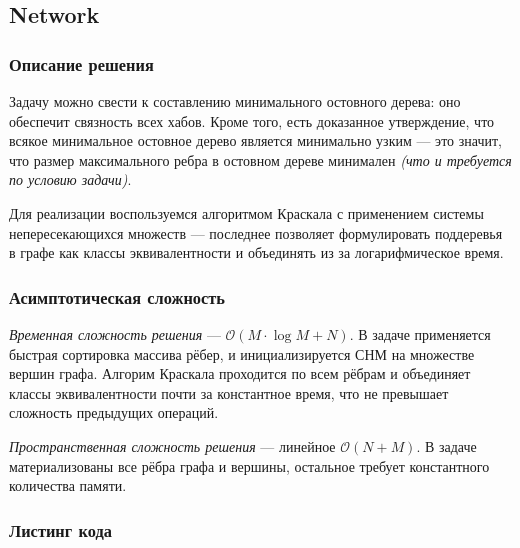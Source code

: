 \subsection{Network}

\subsubsection{Описание решения}

Задачу можно свести к составлению минимального остовного дерева: оно обеспечит связность всех хабов. Кроме того, есть доказанное утверждение, что всякое минимальное остовное дерево является минимально узким --- это значит, что размер максимального ребра в остовном дереве минимален \textit{(что и требуется по условию задачи)}.

Для реализации воспользуемся алгоритмом Краскала с применением системы непересекающихся множеств --- последнее позволяет формулировать поддеревья в графе как классы эквивалентности и объединять из за логарифмическое время.

\subsubsection{Асимптотическая сложность}

\textit{Временная сложность решения} --- \( \mathcal{O}(M\cdot\log M+N) \). В задаче применяется быстрая сортировка массива рёбер, и инициализируется СНМ на множестве вершин графа. Алгорим Краскала проходится по всем рёбрам и объединяет классы эквивалентности почти за константное время, что не превышает сложность предыдущих операций.

\textit{Пространственная сложность решения} --- линейное \( \mathcal{O}(N+M) \). В задаче материализованы все рёбра графа и вершины, остальное требует константного количества памяти.

\subsubsection{Листинг кода}

